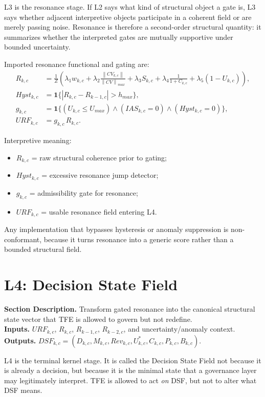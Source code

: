 \documentclass[11pt]{report}
\newcommand{\norm}[1]{\left\lVert #1 \right\rVert}
\newcommand{\meta}[3]{\textbf{Section Description.} #1\\
\textbf{Inputs.} #2\\
\textbf{Outputs.} #3\par}
\begin{document}
L3 is the resonance stage. If L2 says what kind of structural object a gate is, L3 says whether adjacent interpretive objects participate in a coherent field or are merely passing noise. Resonance is therefore a second-order structural quantity: it summarizes whether the interpreted gates are mutually supportive under bounded uncertainty.

Imported resonance functional and gating are:
\begin{align*}
R_{k,c} &= \frac{1}{Z}\left(\lambda_1w_{k,c} + \lambda_2\frac{\norm{CV_{k,c}}}{\norm{CV}_{max}} + \lambda_3S_{k,c} + \lambda_4\frac{1}{1+C_{k,c}} + \lambda_5(1-U_{k,c})\right),\\
Hyst_{k,c} &= \mathbf{1}\{|R_{k,c}-R_{k-1,c}|>h_{max}\},\\
g_{k,c} &= \mathbf{1}\{(U_{k,c}\le U_{max})\wedge(IAS_{k,c}=0)\wedge(Hyst_{k,c}=0)\},\\
URF_{k,c} &= g_{k,c}\,R_{k,c}.
\end{align*}

Interpretive meaning:
\begin{itemize}
    \item $R_{k,c}$ = raw structural coherence prior to gating;
    \item $Hyst_{k,c}$ = excessive resonance jump detector;
    \item $g_{k,c}$ = admissibility gate for resonance;
    \item $URF_{k,c}$ = usable resonance field entering L4.
\end{itemize}

Any implementation that bypasses hysteresis or anomaly suppression is non-conformant, because it turns resonance into a generic score rather than a bounded structural field.

\section{L4: Decision State Field}
\meta{Transform gated resonance into the canonical structural state vector that TFE is allowed to govern but not redefine.}{$URF_{k,c}$, $R_{k,c}$, $R_{k-1,c}$, $R_{k-2,c}$, and uncertainty/anomaly context.}{$DSF_{k,c}=(D_{k,c},M_{k,c},Rev_{k,c},U^{\ast}_{k,c},C_{k,c},P_{k,c},B_{k,c})$.}

L4 is the terminal kernel stage. It is called the Decision State Field not because it is already a decision, but because it is the minimal state that a governance layer may legitimately interpret. TFE is allowed to act \emph{on} DSF, but not to alter what DSF means.
\end{document}
